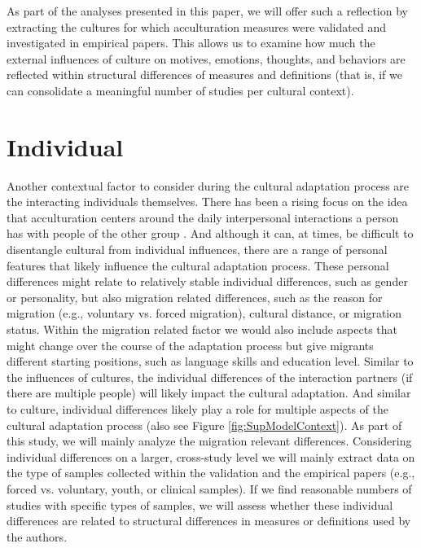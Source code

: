 \documentclass[man, 12pt, a4paper]{apa7}
\begin{document}
As part of the analyses presented in this paper, we will offer such a reflection by extracting the cultures for which acculturation measures were validated and investigated in empirical papers. This allows us to examine how much the external influences of culture on motives, emotions, thoughts, and behaviors are reflected within structural differences of measures and definitions (that is, if we can consolidate a meaningful number of studies per cultural context).

\section{Individual} 
Another contextual factor to consider during the cultural adaptation process are the interacting individuals themselves. There has been a rising focus on the idea that acculturation centers around the daily interpersonal interactions a person has with people of the other group \citep{Maxwell2017, Sam2010}. And although it can, at times, be difficult to disentangle cultural from individual influences, there are a range of personal features that likely influence the cultural adaptation process. These personal differences might relate to relatively stable individual differences, such as gender or personality, but also migration related differences, such as the reason for migration (e.g., voluntary vs. forced migration), cultural distance, or migration status. Within the migration related factor we would also include aspects that might change over the course of the adaptation process but give migrants different starting positions, such as language skills and education level.
Similar to the influences of cultures, the individual differences of the interaction partners (if there are multiple people) will likely impact the cultural adaptation. And similar to culture, individual differences likely play a role for multiple aspects of the cultural adaptation process (also see Figure \ref{fig:SupModelContext}). As part of this study, we will mainly analyze the migration relevant differences. Considering individual differences on a larger, cross-study level we will mainly extract data on the type of samples collected within the validation and the empirical papers (e.g., forced vs. voluntary, youth, or clinical samples). If we find reasonable numbers of studies with specific types of samples, we will assess whether these individual differences are related to structural differences in measures or definitions used by the authors.
\end{document}
